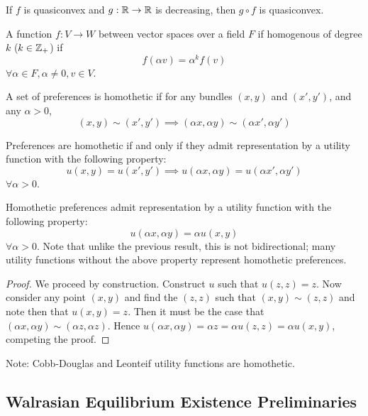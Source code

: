 \begin{prop}
  If $f$ is quasiconvex and $g: {\mathbb R} \to {\mathbb R}$ is decreasing, then $g
  \circ f$ is quasiconvex.
\end{prop}

\begin{definition}
  A function $f: V \to W$ between vector spaces over a field $F$ if
  homogenous of degree $k$ ($k \in {\mathbb Z}_+$) if
  \[
  f(\alpha v) = \alpha^kf(v)
  \]
  $\forall \alpha \in F, \alpha \neq 0, v \in V$.
\end{definition}

\begin{definition}
  A set of preferences is homothetic if for any bundles $(x,y)$ and
  $(x', y')$, and any $\alpha > 0$,
  \[
  (x,y) \sim (x', y') \implies (\alpha x, \alpha y) \sim (\alpha x', \alpha y')
  \]
\end{definition}

\begin{prop}
  Preferences are homothetic if and only if they admit representation
  by a utility function with the following property:
  \[
  u(x, y) = u(x', y') \implies u(\alpha x, \alpha y) = u(\alpha x', \alpha y')
  \]
  $\forall \alpha > 0$. 
\end{prop}

\begin{prop}
  Homothetic preferences admit representation by a utility function
  with the following property:
  \[
  u(\alpha x, \alpha y) = \alpha u(x,y)
  \]
  $\forall \alpha > 0$. Note that unlike the previous result, this is
  not bidirectional; many utility functions without the above property
  represent homothetic preferences.
\end{prop}

\begin{proof}
  We proceed by construction. Construct $u$ such that $u(z,z) =
  z$. Now consider any point $(x,y)$ and find the $(z,z)$ such that
  $(x,y)\sim(z,z)$ and note then that $u(x,y) = z$. Then it must be
  the case that $(\alpha x, \alpha y) \sim (\alpha z, \alpha
  z)$. Hence $u(\alpha x, \alpha y) = \alpha z = \alpha u(z, z) =
  \alpha u( x,y)$, competing the proof.
\end{proof}

Note: Cobb-Douglas and Leonteif utility functions are homothetic.

\subsection{Walrasian Equilibrium Existence Preliminaries}
\label{sec:walr-equil-exist}

